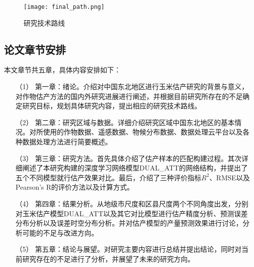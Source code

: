 \clearpage

\begin{figure}
  \centering
  \texttt{[image: final\_path.png]}
  \caption{研究技术路线}
  \label{fig:final_path}
\end{figure}

\subsection{论文章节安排}
\par 本文章节共五章，具体内容安排如下：
\begin{itemize}
  \item [（1）] 第一章：绪论。介绍对中国东北地区进行玉米估产研究的背景与意义，对作物估产方法的国内外研究进展进行阐述，并根据目前研究所存在的不足确定研究目标，规划具体研究内容，提出相应的研究技术路线。
  \item [（2）] 第二章：研究区域与数据。详细介绍研究区域中国东北地区的基本情况。对所使用的作物数据、遥感数据、物候分布数据、数据处理云平台以及各种数据处理方法进行简要概述。
  \item [（3）] 第三章：研究方法。首先具体介绍了估产样本的匹配构建过程。其次详细阐述了本研究构建的深度学习网络模型DUAL\_ATT的网络结构，并提出了五个不同模型就行估产效果对比。最后，介绍了三种评价指标$R^2$、RMSE以及Pearson's R的评价方法以及计算方式。
  \item [（4）] 第四章：结果分析。从地级市尺度和区县尺度两个不同角度出发，分别对玉米估产模型DUAL\_ATT以及其它对比模型进行估产精度分析、预测误差分布分析以及误差时空分布分析。并对估产模型的产量预测效果进行讨论，分析可能的不足与改进方向。
  \item [（5）] 第五章：结论与展望。对研究主要内容进行总结并提出结论，同时对当前研究存在的不足进行了分析，并展望了未来的研究方向。
\end{itemize}